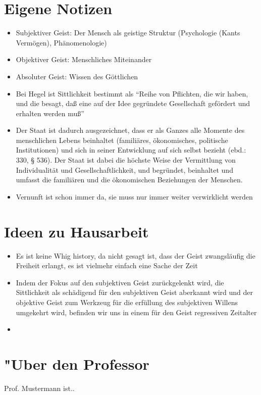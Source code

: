\documentclass[emulatestandardclasses]{scrartcl}
\begin{document}
\section{Eigene Notizen}

\begin{itemize}
  \item Subjektiver Geist: Der Mensch als geistige Struktur (Psychologie (Kants Vermögen), Phänomenologie)
  \item Objektiver Geist: Menschliches Miteinander
  \item Absoluter Geist: Wissen des Göttlichen
  \item Bei Hegel ist Sittlichkeit bestimmt als "`Reihe von Pflichten, die wir haben, und die besagt, daß eine auf der Idee gegründete Gesellschaft gefördert und erhalten werden muß"'
  \item Der Staat ist dadurch ausgezeichnet, dass er als Ganzes alle Momente des menschlichen Lebens beinhaltet (familiäres, ökonomisches, politische Institutionen) und sich in seiner Entwicklung auf sich selbst bezieht (ebd.: 330, § 536). Der Staat ist dabei die höchste Weise der Vermittlung von Individualität und Gesellschaftlichkeit, und begründet, beinhaltet und umfasst die familiären und die ökonomischen Beziehungen der Menschen. 
  \item Vernunft ist schon immer da, sie muss nur immer weiter verwirklicht werden
\end{itemize}

\section{Ideen zu Hausarbeit}

\begin{itemize}
  \item Es ist keine Whig history, da nicht gesagt ist, dass der Geist zwangsläufig die Freiheit erlangt, es ist vielmehr einfach eine Sache der Zeit
  \item Indem der Fokus auf den subjektiven Geist zurückgelenkt wird, die Sittlichkeit als schädigend für den subjektiven Geist aberkannt wird und der objektive Geist zum Werkzeug für die erfüllung des subjektiven Willens umgekehrt wird, befinden wir uns in einem für den Geist regressiven Zeitalter
  \item 
\end{itemize}



\newpage
\section{"Uber den Professor}
Prof. Mustermann ist..


\end{document}
